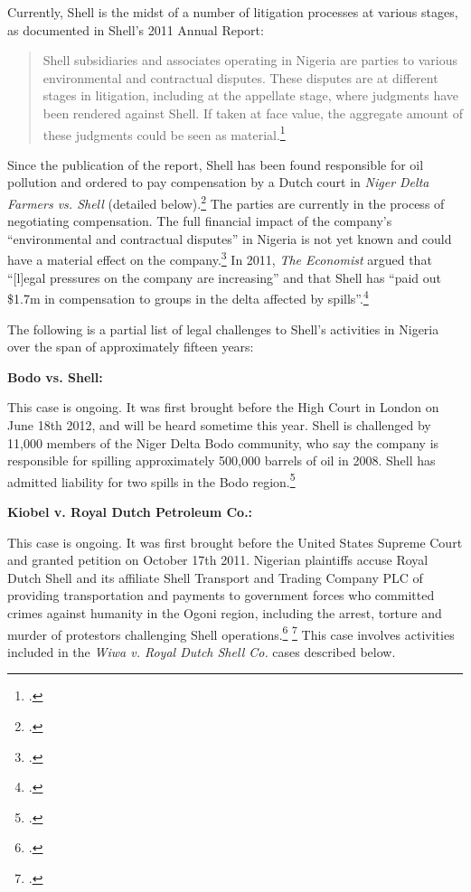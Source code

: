 Currently, Shell is the midst of a number of litigation processes at various stages, as documented in Shell's 2011 Annual Report:
\begin{quote}
Shell subsidiaries and associates operating in Nigeria are parties to various environmental and contractual disputes.
These disputes are at different stages in litigation, including at the appellate stage, where judgments have been rendered against Shell. 
If taken at face value, the aggregate amount of these judgments could be seen as material.\footcite[][P.138]{Shell_2011}
\end{quote}
Since the publication of the report, Shell has been found responsible for oil pollution and ordered to pay compensation by a Dutch court in \emph{Niger Delta Farmers vs. Shell} (detailed below).\footcite[See also:][]{DutchResponsible}
The parties are currently in the process of negotiating compensation.
The full financial impact of the company's ``environmental and contractual disputes'' in Nigeria is not yet known and could have a material effect on the company.\footcite[][p. 139]{Shell_2011}
In 2011, \emph{The Economist} argued that ``[l]egal pressures on the company are increasing'' and that Shell has ``paid out \$1.7m in compensation to groups in the delta affected by spills''.\footcite{OilSpoils}


The following is a partial list of legal challenges to Shell's activities in Nigeria over the span of approximately fifteen years:



\textbf{Bodo vs. Shell:}



This case is ongoing. 
It was first brought before the High Court in London on June 18th 2012, and will be heard sometime this year. 
Shell is challenged by 11,000 members of the Niger Delta Bodo community, who say the company is responsible for spilling approximately 500,000 barrels of oil in 2008. 
Shell has admitted liability for two spills in the Bodo region.\footcite{DutchResponsible}



\textbf{Kiobel v. Royal Dutch Petroleum Co.:} 



This case is ongoing. 
It was first brought before the United States Supreme Court and granted petition on October 17th 2011. 
Nigerian plaintiffs accuse Royal Dutch Shell and its affiliate Shell Transport and Trading Company PLC of providing transportation and payments to government forces who committed crimes against humanity in the Ogoni region, including the arrest, torture and murder of protestors challenging Shell operations.\footcite{KiobelShell} \footcite{TortureComplicity}
This case involves activities included in the \emph{Wiwa v. Royal Dutch Shell Co.} cases described below.



